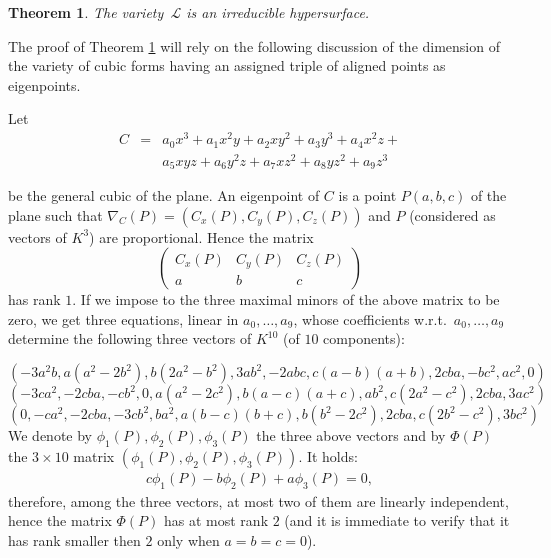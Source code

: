 \documentclass{amsart}
\theoremstyle{plain}
\newtheorem{theorem}{Theorem}
\theoremstyle{definition}
\begin{document}
\begin{theorem}\label{thm: dimension of L}
The variety~$\mathcal{L}$ is an irreducible hypersurface.
\end{theorem}


The proof of Theorem \ref{thm: dimension of L} will rely  on the following discussion of the dimension of 
the variety of cubic forms having an assigned triple of aligned points as eigenpoints.

Let
\begin{equation}
  \begin{array}{lcr}
  C &=& a_0x^3 + a_1x^2y + a_2xy^2 + a_3y^3 + a_4x^2z +\\
  & & a_5xyz + a_6y^2z + a_7xz^2 + a_8yz^2 + a_9z^3
  \end{array}
    \label{cubicaGen}
\end{equation}

be the general cubic of the plane. An eigenpoint of $C$ is a point
$P(a, b, c)$ of the plane such that $\nabla_C(P) =
\left(C_x(P), C_y(P), C_z(P)\right)$
and $P$ (considered as
vectors of $K^3$) are proportional.  Hence the matrix
\[ \left(
\begin{array}{ccc}
  C_x(P) & C_y(P) & C_z(P) \\
  a & b& c
\end{array}
\right)
\]
has rank $1$. 
If we impose to the three maximal minors of the above matrix to be zero,
we get three equations, linear in 
$a_0, \dots, a_9$, whose coefficients  w.r.t.\
$a_0, \dots, a_9$ 
determine the following three vectors of $K^{10}$ (of $10$ components):

{\small
\[(-3a^2b, a(a^2 - 2b^2), b(2a^2 - b^2), 3ab^2,
 -2abc, c(a - b)(a + b), 2  c  b  a,
 -b  c^2, a  c^2, 0)
\]
\[
(-3ca^2,
-2cba,
-cb^2,
0,
a(a^2-2c^2),
b(a-c)(a+c),
ab^2,
c(2a^2-c^2),
2cba,
3ac^2)
\]
\[
(0,
-ca^2,
-2cba,
-3cb^2,
ba^2,
a(b-c)(b+c),
b(b^2-2c^2),
2cba,
c(2b^2-c^2),
3bc^2)
\]
}
We denote by  $\phi_1(P), \phi_2(P), \phi_3(P)$ the three above vectors
and by $\Phi(P)$ the $3\times 10$ matrix $(\phi_1(P), \phi_2(P), \phi_3(P))$.
It holds:
\begin{eqnarray}
  c\phi_1(P)-b\phi_2(P)+a\phi_3(P) = 0,
  \label{eqBase}
\end{eqnarray}
therefore,
among the three vectors, at most two of them are linearly independent,
hence the matrix $\Phi(P)$ has at most rank $2$ (and it is immediate to
verify that it has rank smaller then $2$ only when $a=b=c=0$).
\end{document}
